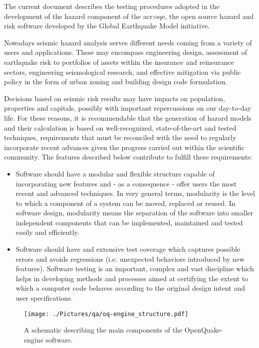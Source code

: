 The current document describes the testing procedures adopted in 
the development of the hazard component of the \gls{acr:oqe}, the 
open source hazard and risk software developed by the Global 
Earthquake Model initiative.

Nowadays seismic hazard analysis serves different needs coming 
from a variety of users and applications.
%
These may encompass engineering design, assessment of earthquake risk 
to portfolios of assets within the insurance and reinsurance sectors, 
engineering seismological research, and effective mitigation via public 
policy in the form of urban zoning and building design code formulation.

Decisions based on seismic risk results may have impacts on
population, properties and capitals, possibly with important repercussions 
on our day-to-day life. For these reasons, it is recommendable that 
the generation of hazard models and their calculation is based on 
well-recognized, state-of-the-art and tested techniques, requirements 
that must be reconciled with the need to regularly incorporate 
recent advances given the progress carried out within the 
scientific community.
%
The features described below contribute to fulfill these requirements: 
%
\begin{itemize}
    \item Software should have a modular and flexible structure capable of 
    incorporating new features and - as a consequence - offer users 
    the most recent and advanced techniques.
    In very general terms, modularity is the level to which a component 
    of a system can be moved, replaced or reused.
    In software design, modularity means the separation of the software
    into smaller independent components that can be implemented, maintained 
    and tested easily and efficiently.
    \item Software should have and extensive test coverage which captures 
    possible errors and avoids regressions (i.e. unexpected behaviors 
    introduced by new features).
    Software testing \parencite{myers2012} is an important, complex and 
    vast discipline which helps in developing methods and processes aimed at 
    certifying the extent to which a computer code behaves according 
    to the original design intent and user specifications.
\end{itemize}
\begin{figure}[!ht]
\centering
\texttt{[image: ./Pictures/qa/oq-engine\_structure.pdf]}
\caption{A schematic describing the main components of the OpenQuake-engine 
    software.}
\label{fig:oqe_structure}
\end{figure}
